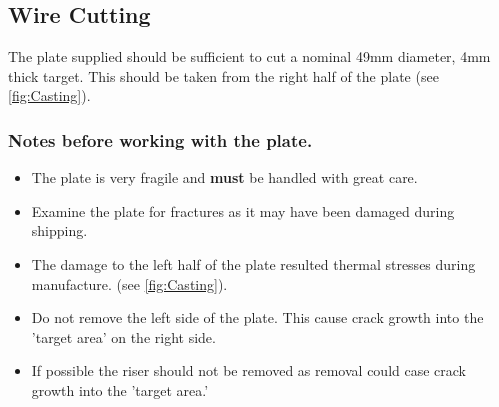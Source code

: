 \subsection{Wire Cutting}
The plate supplied should be sufficient to cut a nominal 49mm diameter, 4mm thick target. This should be taken from the right half of the plate (see \ref{fig:Casting}). 

\subsubsection{Notes before working with the plate.}
\begin{itemize}
\item The plate is very fragile and \textbf{must} be handled with great care. 
\item Examine the plate for fractures as it may have been damaged during shipping. 
\item The damage to the left half of the plate resulted thermal stresses during manufacture. (see \ref{fig:Casting}). 
\item Do not remove the left side of the plate. This cause crack growth into the 'target area' on the right side.
\item If possible the riser should not be removed as removal could case crack growth into the 'target area.'
\end{itemize}